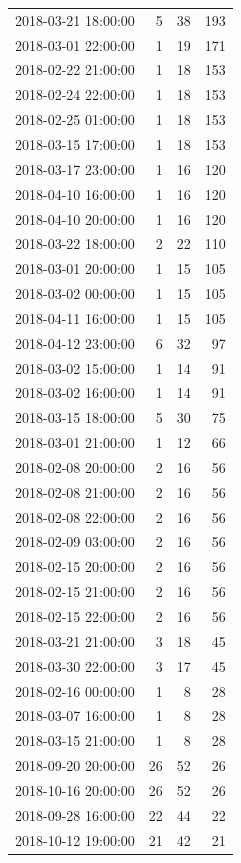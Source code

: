\begin{tabular}{lrrr}
2018-03-21 18:00:00 & 5 & 38 & 193 \\
2018-03-01 22:00:00 & 1 & 19 & 171 \\
2018-02-22 21:00:00 & 1 & 18 & 153 \\
2018-02-24 22:00:00 & 1 & 18 & 153 \\
2018-02-25 01:00:00 & 1 & 18 & 153 \\
2018-03-15 17:00:00 & 1 & 18 & 153 \\
2018-03-17 23:00:00 & 1 & 16 & 120 \\
2018-04-10 16:00:00 & 1 & 16 & 120 \\
2018-04-10 20:00:00 & 1 & 16 & 120 \\
2018-03-22 18:00:00 & 2 & 22 & 110 \\
2018-03-01 20:00:00 & 1 & 15 & 105 \\
2018-03-02 00:00:00 & 1 & 15 & 105 \\
2018-04-11 16:00:00 & 1 & 15 & 105 \\
2018-04-12 23:00:00 & 6 & 32 & 97 \\
2018-03-02 15:00:00 & 1 & 14 & 91 \\
2018-03-02 16:00:00 & 1 & 14 & 91 \\
2018-03-15 18:00:00 & 5 & 30 & 75 \\
2018-03-01 21:00:00 & 1 & 12 & 66 \\
2018-02-08 20:00:00 & 2 & 16 & 56 \\
2018-02-08 21:00:00 & 2 & 16 & 56 \\
2018-02-08 22:00:00 & 2 & 16 & 56 \\
2018-02-09 03:00:00 & 2 & 16 & 56 \\
2018-02-15 20:00:00 & 2 & 16 & 56 \\
2018-02-15 21:00:00 & 2 & 16 & 56 \\
2018-02-15 22:00:00 & 2 & 16 & 56 \\
2018-03-21 21:00:00 & 3 & 18 & 45 \\
2018-03-30 22:00:00 & 3 & 17 & 45 \\
2018-02-16 00:00:00 & 1 & 8 & 28 \\
2018-03-07 16:00:00 & 1 & 8 & 28 \\
2018-03-15 21:00:00 & 1 & 8 & 28 \\
2018-09-20 20:00:00 & 26 & 52 & 26 \\
2018-10-16 20:00:00 & 26 & 52 & 26 \\
2018-09-28 16:00:00 & 22 & 44 & 22 \\
2018-10-12 19:00:00 & 21 & 42 & 21 \\

\end{tabular}
